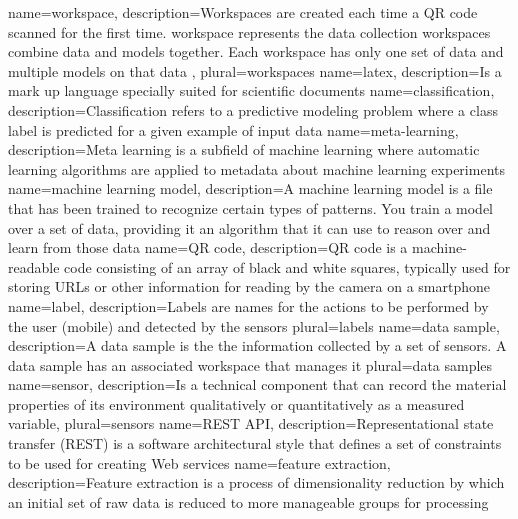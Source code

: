 {
    name={workspace},
    description={Workspaces are created each time a QR code scanned for the first time. \Gls{workspace} represents the data collection \Glspl{workspace} combine data and models together. Each workspace has only one set of data and multiple models on that data
    },
    plural={workspaces}
}
{
    name={latex},
    description={Is a mark up language specially suited for scientific documents}
}
{
    name={classification},
    description={Classification refers to a predictive modeling problem where a class \gls{label} is predicted for a given example of input data}
}
{
    name={meta-learning},
    description={Meta learning is a subfield of machine learning where automatic learning algorithms are applied to metadata about machine learning experiments}
}
{
    name={machine learning model},
    description={A machine learning model is a file that has been trained to recognize certain types of patterns. You train a model over a set of data, providing it an algorithm that it can use to reason over and learn from those data}
}
{
    name={QR code},
    description={QR code is a machine-readable code consisting of an array of black and white squares, typically used for storing URLs or other information for reading by the camera on a smartphone}
}
{
    name={label},
    description={Labels are names for the actions to be performed by the user (mobile) and detected by the sensors}
    plural={labels}
}
{
    name={data sample},
    description={A data sample is the the information collected by a set of sensors. A data sample has an associated \gls{workspace} that manages it}
    plural={data samples}
}
{
    name={sensor},
    description={Is a technical component that can record the material properties of its environment qualitatively or quantitatively as a measured variable},
    plural={sensors}
}
{
    name={REST API},
    description={Representational state transfer (REST) is a software architectural style that defines a set of constraints to be used for creating Web services}
}
{
    name={feature extraction},
    description={Feature extraction is a process of dimensionality reduction by which an initial set of raw data is reduced to more manageable groups for processing}
}
